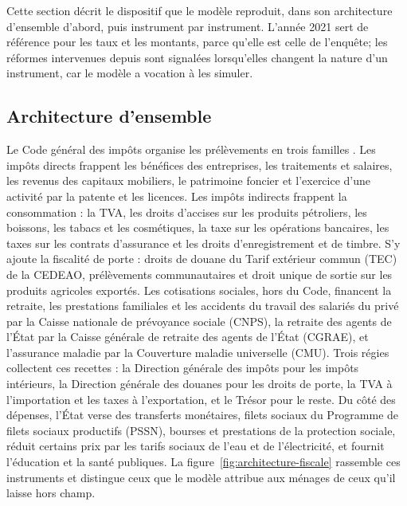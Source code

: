 \documentclass[11pt,a4paper]{article}
\begin{document}
Cette section décrit le dispositif que le modèle reproduit, dans son
architecture d'ensemble d'abord, puis instrument par instrument. L'année 2021
sert de référence pour les taux et les montants, parce qu'elle est celle de
l'enquête; les réformes intervenues depuis sont signalées lorsqu'elles changent
la nature d'un instrument, car le modèle a vocation à les simuler.

\subsection{Architecture d'ensemble}

Le Code général des impôts organise les prélèvements en trois familles
\citep{civcgi2021,dgi2025impots}. Les impôts directs frappent les bénéfices des
entreprises, les traitements et salaires, les revenus des capitaux mobiliers,
le patrimoine foncier et l'exercice d'une activité par la patente et les
licences. Les impôts indirects frappent la consommation : la TVA, les droits
d'accises sur les produits pétroliers, les boissons, les tabacs et les
cosmétiques, la taxe sur les opérations bancaires, les taxes sur les contrats
d'assurance et les droits d'enregistrement et de timbre. S'y ajoute la fiscalité
de porte : droits de douane du Tarif extérieur commun (TEC) de la CEDEAO,
prélèvements communautaires et droit unique de sortie sur les produits
agricoles exportés.
Les cotisations sociales, hors du Code, financent la retraite, les prestations
familiales et les accidents du travail des salariés du privé par la Caisse
nationale de prévoyance sociale (CNPS), la retraite des agents de l'État par la
Caisse générale de retraite des agents de l'État (CGRAE), et l'assurance maladie
par la Couverture maladie universelle (CMU). Trois régies collectent ces
recettes : la Direction générale des impôts pour les impôts intérieurs, la
Direction générale des douanes pour les droits de porte, la TVA à l'importation
et les taxes à l'exportation, et le Trésor pour le reste. Du côté des
dépenses, l'État verse des transferts monétaires, filets sociaux du Programme
de filets sociaux productifs (PSSN), bourses et prestations de la protection
sociale, réduit certains prix par les tarifs sociaux de l'eau et de
l'électricité, et fournit l'éducation et la santé publiques. La figure~\ref{fig:architecture-fiscale} rassemble ces instruments
et distingue ceux que le modèle attribue aux ménages de ceux qu'il laisse hors
champ.
\end{document}

